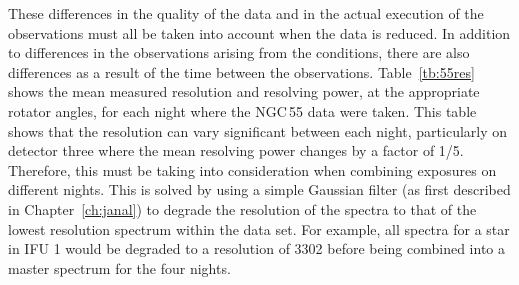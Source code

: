 These differences in the quality of the data and in the actual execution of the observations must all be taken into account when the data is reduced.
In addition to differences in the observations arising from the conditions, there are also differences as a result of the time between the observations.
Table~\ref{tb:55res} shows the mean measured resolution and resolving power, at the appropriate rotator angles, for each night where the NGC\,55 data were taken.
This table shows that the resolution can vary significant between each night, particularly on detector three where the mean resolving power changes by a factor of 1/5.
Therefore, this must be taking into consideration when combining exposures on different nights.
This is solved by using a simple Gaussian filter (as first described in Chapter~\ref{ch:janal}) to degrade the resolution of the spectra to that of the lowest resolution spectrum within the data set.
For example, all spectra for a star in IFU 1 would be degraded to a resolution of 3302 before being combined into a master spectrum for the four nights.


